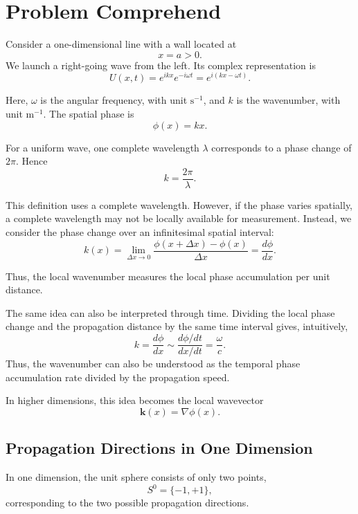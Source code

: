 



\section{Problem Comprehend}
Consider a one-dimensional line with a wall located at
\[
    x=a>0.
\]
We launch a right-going wave from the left. Its complex representation is
\[
    U(x,t)=e^{ikx}e^{-i\omega t}
    =e^{i(kx-\omega t)}.
\]

Here, $\omega$ is the angular frequency, with unit $\mathrm{s}^{-1}$,
and $k$ is the wavenumber, with unit $\mathrm{m}^{-1}$.
The spatial phase is
\[
    \phi(x)=kx.
\]

For a uniform wave, one complete wavelength $\lambda$ corresponds to
a phase change of $2\pi$. Hence
\[
    k=\frac{2\pi}{\lambda}.
\]

This definition uses a complete wavelength. However, if the phase varies
spatially, a complete wavelength may not be locally available for
measurement. Instead, we consider the phase change over an infinitesimal
spatial interval:
\[
    k(x)
    =\lim_{\Delta x\to0}
    \frac{\phi(x+\Delta x)-\phi(x)}{\Delta x}
    =\frac{d\phi}{dx}.
\]

Thus, the local wavenumber measures the local phase accumulation per
unit distance.

The same idea can also be interpreted through time.
Dividing the local phase change and the propagation distance
by the same time interval gives, intuitively,
\[
    k
    =\frac{d\phi}{dx}
    \sim
    \frac{d\phi/dt}{dx/dt}
    =\frac{\omega}{c}.
\]
Thus, the wavenumber can also be understood as the temporal phase
accumulation rate divided by the propagation speed.


In higher dimensions, this idea becomes the local wavevector
\[
    \mathbf{k}(x)=\nabla\phi(x).
\]


\subsection{Propagation Directions in One Dimension}
In one dimension, the unit sphere consists of only two points,
\[
    S^0=\{-1,+1\},
\]
corresponding to the two possible propagation directions.

